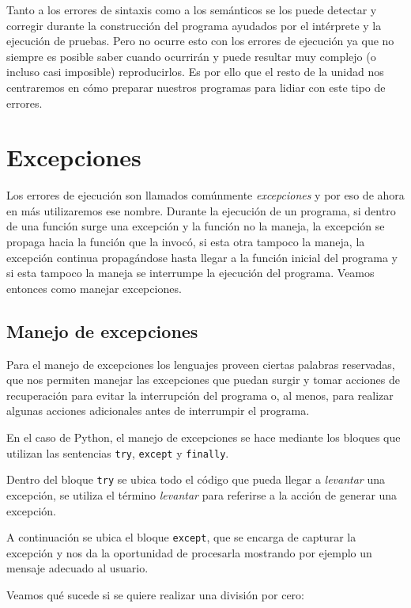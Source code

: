Tanto a los errores de sintaxis como a los semánticos se los puede detectar y
corregir durante la construcción del programa ayudados por el intérprete y
la ejecución de pruebas. Pero no ocurre esto con los errores de ejecución ya
que no siempre es posible saber cuando ocurrirán y puede resultar muy complejo
(o incluso casi imposible) reproducirlos. Es por ello que el resto de la
unidad nos centraremos en cómo preparar nuestros programas para lidiar con
este tipo de errores.

\section{Excepciones}

Los errores de ejecución son llamados comúnmente {\it excepciones} y por eso
de ahora en más utilizaremos ese nombre. Durante la ejecución de un programa,
si dentro de una función surge una excepción y la función no la maneja, la
excepción se propaga hacia la función que la invocó, si esta otra tampoco la
maneja, la excepción continua propagándose hasta llegar a la función inicial
del programa y si esta tampoco la maneja se interrumpe la ejecución del
programa. Veamos entonces como manejar excepciones.

\subsection{Manejo de excepciones} 

Para el manejo de excepciones los lenguajes proveen ciertas palabras
reservadas, que nos permiten manejar las excepciones que puedan surgir y
tomar acciones de recuperación para evitar la interrupción del programa o,
al menos, para realizar algunas acciones adicionales antes de interrumpir
el programa.

En el caso de Python, el manejo de excepciones se hace mediante los
bloques que utilizan las sentencias \lstinline!try!, \lstinline!except! y
\lstinline!finally!. 

Dentro del bloque \lstinline!try! se ubica todo el código que pueda llegar
a {\it levantar} una excepción, se utiliza el término {\it levantar} para
referirse a la acción de generar una excepción.

A continuación se ubica el bloque \lstinline!except!, que se encarga de
capturar la excepción y nos da la oportunidad de procesarla mostrando por
ejemplo un mensaje adecuado al usuario. 

Veamos qué sucede si se quiere realizar una división por cero:


